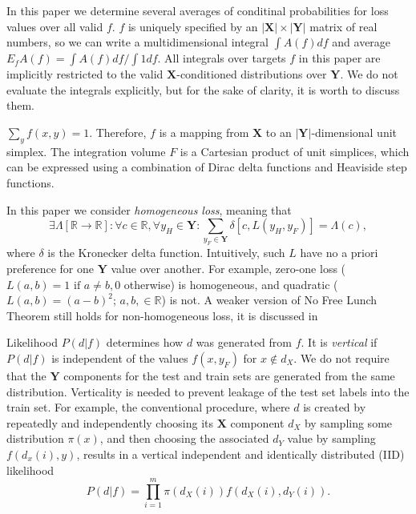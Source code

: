 \documentclass[a4paper]{article}
\begin{document}
In this paper we determine several averages of conditinal
probabilities for loss values over all valid $f$. $f$ is uniquely
specified by an $|\mathbf{X}|\times |\mathbf{Y}|$ matrix of real
numbers, so we can write a multidimensional integral $\int A(f) df$
and average $E_f A(f) = \int A(f) df / \int 1 df$. All integrals over
targets $f$ in this paper are implicitly restricted to the valid
$\mathbf{X}$-conditioned distributions over $\mathbf{Y}$. We do not
evaluate the integrals explicitly, but for the sake of clarity, it is
worth to discuss them.

$\sum_y f(x,y) = 1$. Therefore, $f$ is a mapping from $\mathbf{X}$ to
an $|\mathbf{Y}|$-dimensional unit simplex. The integration volume $F$ is a
Cartesian product of unit simplices, which can be expressed using a
combination of Dirac delta functions and Heaviside step functions.

In this paper we consider \textit{homogeneous loss}, meaning that
\begin{equation}
  \exists \Lambda [\mathbb{R} \rightarrow \mathbb{R}]:
  \forall c \in \mathbb{R}, \forall y_H \in \mathbf{Y}:
  \sum_{y_F \in \mathbf{Y}} \delta\left[c, L(y_H, y_F)\right] = \Lambda(c),
\end{equation}
where $\delta$ is the Kronecker delta function.  Intuitively, such $L$
have no a priori preference for one $\mathbf{Y}$ value over
another. For example, zero-one loss
($L(a,b) = 1 \text{ if } a\neq b, 0$ otherwise) is homogeneous, and
quadratic ($L(a,b) = (a - b)^2$; $a, b, \in \mathbb{R}$) is not. A
weaker version of No Free Lunch Theorem still holds for
non-homogeneous loss, it is discussed in \cite{Wolpert-yes-lunch}

Likelihood $P(d|f)$ determines how $d$ was generated from $f$. It is
\textit{vertical} if $P(d|f)$ is independent of the values $f(x, y_F)$
for $x \notin d_X$. We do not require that the $\mathbf{Y}$ components
for the test and train sets are generated from the same distribution.
Verticality is needed to prevent leakage of the test set labels into
the train set. For example, the conventional procedure, where $d$ is
created by repeatedly and independently choosing its $\mathbf{X}$
component $d_X$ by sampling some distribution $\pi(x)$, and then
choosing the associated $d_Y$ value by sampling
$f\left(d_x(i), y\right)$, results in a vertical independent and
identically distributed (IID) likelihood
\begin{equation}
  P(d|f) = \prod_{i=1}^m \pi(d_X(i)) f(d_X(i), d_Y(i)).
\end{equation}
\end{document}
